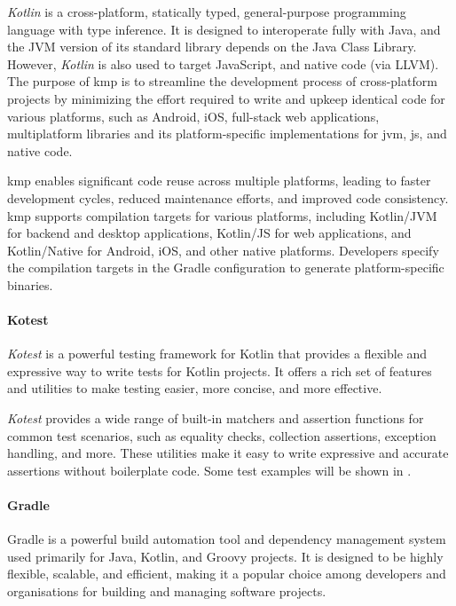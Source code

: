 \emph{Kotlin} is a cross-platform, statically typed, general-purpose programming language with type inference.
It is designed to interoperate fully with Java, and the JVM version of its standard library depends on the Java Class Library.
However, \emph{Kotlin} is also used to target JavaScript, and native code (via LLVM).
The purpose of \ac{kmp} is to streamline the development process of cross-platform projects by minimizing
the effort required to write and upkeep identical code for various platforms, such as Android, iOS, full-stack web applications,
multiplatform libraries and its platform-specific implementations for \ac{jvm}, \ac{js}, and native code.

\ac{kmp} enables significant code reuse across multiple platforms, leading to faster development cycles,
reduced maintenance efforts, and improved code consistency.
\ac{kmp} supports compilation targets for various platforms, including Kotlin/JVM for backend and desktop applications,
Kotlin/JS for web applications, and Kotlin/Native for Android, iOS, and other native platforms.
Developers specify the compilation targets in the Gradle configuration to generate platform-specific binaries.

\paragraph{Kotest}
\emph{Kotest} is a powerful testing framework for Kotlin that provides a flexible and expressive way to write tests for Kotlin projects.
It offers a rich set of features and utilities to make testing easier, more concise, and more effective.

\emph{Kotest} provides a wide range of built-in matchers and assertion functions for common test scenarios, such as equality
checks, collection assertions, exception handling, and more.
These utilities make it easy to write expressive and accurate assertions without boilerplate code.
Some test examples will be shown in .

\paragraph{Gradle}
Gradle is a powerful build automation tool and dependency management system used primarily for Java, Kotlin, and Groovy projects.
It is designed to be highly flexible, scalable, and efficient, making it a popular choice among developers and
organisations for building and managing software projects.

